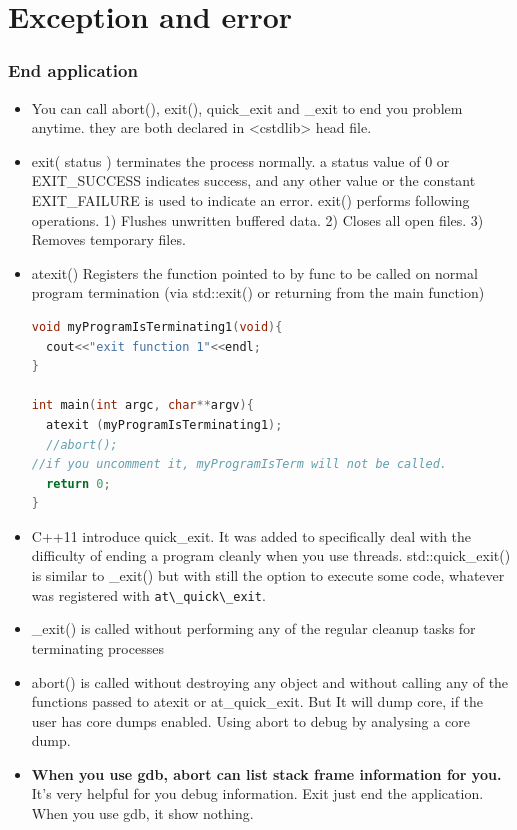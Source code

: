 \documentclass[a4paper,12pt,twoside]{book}
\begin{document}
\chapter{Exception and error}
\subsection{End application}
\begin{itemize}
\item You can call abort(), exit(), quick\_exit and  \_exit to end you problem anytime. they are both declared in <cstdlib> head file.

\item exit( status ) terminates the process normally.
a status value of 0 or EXIT\_SUCCESS indicates success, and any other value or the constant EXIT\_FAILURE is used to indicate an error. exit() performs following operations. 1) Flushes unwritten buffered data.
2) Closes all open files. 3) Removes temporary files.

\item atexit() Registers the function pointed to by func to be called on normal program termination (via std::exit() or returning from the main function)
\begin{lstlisting}[frame=single, language=c++]
void myProgramIsTerminating1(void){
  cout<<"exit function 1"<<endl;
}

int main(int argc, char**argv){
  atexit (myProgramIsTerminating1);
  //abort();
//if you uncomment it, myProgramIsTerm will not be called.
  return 0;
}
\end{lstlisting}

\item C++11 introduce quick\_exit. It was added to specifically deal with the difficulty of ending a program cleanly when you use threads. std::quick\_exit() is similar to \_exit() but with still the option to execute some code, whatever was registered with \verb=at\_quick\_exit=.

\item \_exit() is called without performing any of the regular cleanup tasks for terminating processes

\item abort() is called without destroying any object and without calling any of the functions passed to atexit or at\_quick\_exit. But It will dump core, if the user has core dumps enabled. Using abort to debug by analysing a core dump.

\item \textbf{When you use gdb, abort can list stack frame information for you.} It's very helpful for you debug information.  Exit just end the application. When you use gdb, it show nothing.



\end{itemize}
\end{document}
